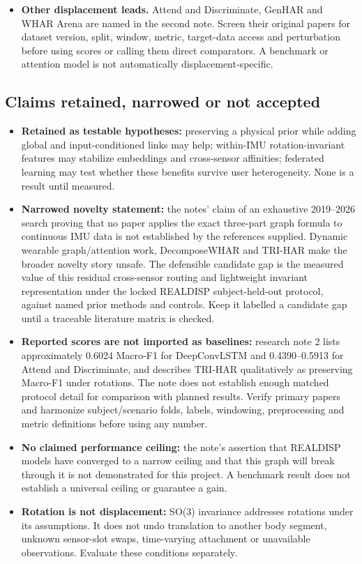 \documentclass[10pt,a4paper]{article}
\begin{document}
\begin{itemize}
\item \textbf{Other displacement leads.} Attend and Discriminate, GenHAR and WHAR Arena are named in the second note. Screen their original papers for dataset version, split, window, metric, target-data access and perturbation before using scores or calling them direct comparators. A benchmark or attention model is not automatically displacement-specific.
\end{itemize}

\subsection{Claims retained, narrowed or not accepted}
\begin{itemize}
\item \textbf{Retained as testable hypotheses:} preserving a physical prior while adding global and input-conditioned links may help; within-IMU rotation-invariant features may stabilize embeddings and cross-sensor affinities; federated learning may test whether these benefits survive user heterogeneity. None is a result until measured.
\item \textbf{Narrowed novelty statement:} the notes' claim of an exhaustive 2019--2026 search proving that no paper applies the exact three-part graph formula to continuous IMU data is not established by the references supplied. Dynamic wearable graph/attention work, DecomposeWHAR and TRI-HAR make the broader novelty story unsafe. The defensible candidate gap is the measured value of this residual cross-sensor routing and lightweight invariant representation under the locked REALDISP subject-held-out protocol, against named prior methods and controls. Keep it labelled a candidate gap until a traceable literature matrix is checked.
\item \textbf{Reported scores are not imported as baselines:} research note 2 lists approximately 0.6024 Macro-F1 for DeepConvLSTM and 0.4390--0.5913 for Attend and Discriminate, and describes TRI-HAR qualitatively as preserving Macro-F1 under rotations. The note does not establish enough matched protocol detail for comparison with planned results. Verify primary papers and harmonize subject/scenario folds, labels, windowing, preprocessing and metric definitions before using any number.
\item \textbf{No claimed performance ceiling:} the note's assertion that REALDISP models have converged to a narrow ceiling and that this graph will break through it is not demonstrated for this project. A benchmark result does not establish a universal ceiling or guarantee a gain.
\item \textbf{Rotation is not displacement:} SO(3) invariance addresses rotations under its assumptions. It does not undo translation to another body segment, unknown sensor-slot swaps, time-varying attachment or unavailable observations. Evaluate these conditions separately.
\end{itemize}
\end{document}
